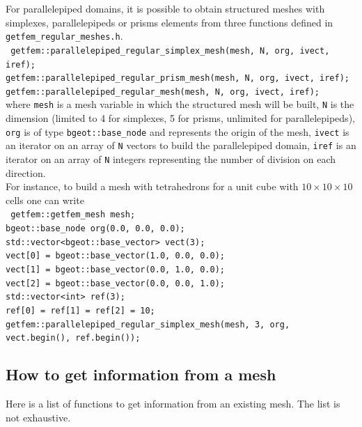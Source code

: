 \documentclass[11pt,a4paper]{article}
\begin{document}
For parallelepiped domains, it is possible to obtain structured meshes with simplexes, parallelepipeds or prisms elements from three functions defined in {\tt getfem\_regular\_meshes.h}. \\[0.5cm]
{\tt
  getfem::parallelepiped\_regular\_simplex\_mesh(mesh, N, org, ivect, iref); \\
  getfem::parallelepiped\_regular\_prism\_mesh(mesh, N, org, ivect, iref); \\
  getfem::parallelepiped\_regular\_mesh(mesh, N, org, ivect, iref);
} \\[0.5cm]
where {\tt mesh} is a mesh variable in which the structured mesh will be built, {\tt N} is the dimension (limited to 4 for simplexes, 5 for prisms, unlimited for parallelepipeds), {\tt org} is of type {\tt bgeot::base\_node} and represents the origin of the mesh, {\tt ivect} is an iterator on an array of {\tt N} vectors to build the parallelepiped domain, {\tt iref} is an iterator on an array of {\tt N} integers representing the number of division on each direction. \\[0.5cm]
For instance, to build a mesh with tetrahedrons for a unit cube with $10\times10\times10$ cells one can write\\[0.5cm]
{\tt
  getfem::getfem\_mesh mesh; \\
  bgeot::base\_node org(0.0, 0.0, 0.0); \\
  std::vector<bgeot::base\_vector> vect(3); \\
  vect[0] = bgeot::base\_vector(1.0, 0.0, 0.0); \\
  vect[1] = bgeot::base\_vector(0.0, 1.0, 0.0); \\
  vect[2] = bgeot::base\_vector(0.0, 0.0, 1.0); \\
  std::vector<int> ref(3); \\
  ref[0] = ref[1] = ref[2] = 10; \\
  getfem::parallelepiped\_regular\_simplex\_mesh(mesh, 3, org, vect.begin(), ref.begin()); 
}\\[0.5cm]


\subsection{How to get information from a mesh}

Here is a list of functions to get information from an existing mesh. The list is not exhaustive.
\end{document}
